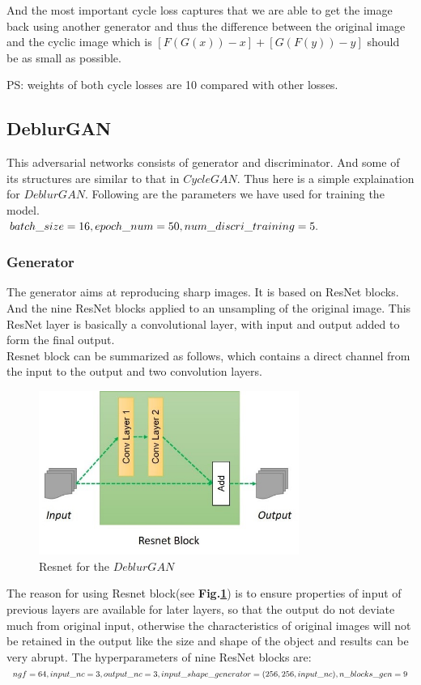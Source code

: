 \documentclass[journal]{IEEEtran}
\begin{document}
And the most important cycle loss captures that we are able to get the image back using another generator and thus the difference between the original image and the cyclic image which is $[F (G(x))-x] + [G(F(y))-y]$ should be as small as possible.

PS: weights of both cycle losses are 10 compared with other losses.


\subsection{DeblurGAN}
This adversarial networks consists of generator and discriminator. And some of its structures are similar to that in $CycleGAN$. Thus here is a simple explaination for $DeblurGAN$. Following are the parameters we have used for training the model.\\
$
batch\_size = 16,\\
epoch\_num = 50,\\
num\_discri\_training = 5.
$
\subsubsection{Generator}
The generator aims at reproducing sharp images. It is based on ResNet blocks. And the nine ResNet blocks applied to an unsampling of the original image. This ResNet layer is basically a convolutional layer, with input and output added to form the final output.\\
Resnet block can be summarized as follows, which contains a direct channel from the input to the output and two convolution layers.
\begin{figure}[htbp]
	\centering
	\includegraphics[width=8.5cm]{fig/resnet.jpg}
	\caption{Resnet for the $DeblurGAN$}
	\label{fig:resnet}
\end{figure}
The reason for using Resnet block(see \textbf{Fig.\ref{fig:resnet}}) is to ensure properties of input of previous layers are available for later layers, so that the output do not deviate much from original input, otherwise the characteristics of original images will not be retained in the output like the size and shape of the object and results can be very abrupt.
The hyperparameters of nine ResNet blocks are: \\
$
ngf = 64,\\
input\_nc = 3,\\
output\_nc = 3,\\
input\_shape\_generator = (256, 256, input\_nc),\\
n\_blocks\_gen = 9
$ 
\end{document}
